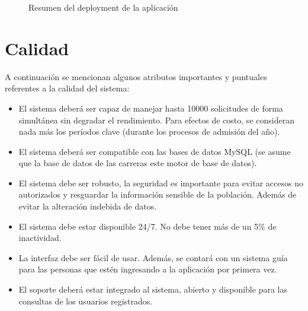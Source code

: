 \documentclass[12pt,a4paper]{article}
\begin{document}
\begin{figure}[H]
  \centering
  \caption{Resumen del deployment de la aplicación}
  \label{fig:deployment}
\end{figure}

\section{Calidad}

A continuación se mencionan algunos atributos importantes y puntuales referentes a la calidad del sistema:

\begin{itemize}
  \item El sistema deberá ser capaz de manejar hasta 10000 solicitudes de forma simultánea sin degradar el rendimiento. Para efectos de costo, se consideran nada más los períodos clave (durante los procesos de admisión del año).
  \item El sistema deberá ser compatible con las bases de datos MySQL (se asume que la base de datos de las carreras este motor de base de datos).
  \item El sistema debe ser robusto, la seguridad es importante para evitar accesos no autorizados y resguardar la información sensible de la población. Además de evitar la alteración indebida de datos.
  \item El sistema debe estar disponible 24/7. No debe tener más de un 5\% de inactividad.
  \item La interfaz debe ser fácil de usar. Además, se contará con un sistema guía para las personas que estén ingresando a la aplicación por primera vez.
  \item El soporte deberá estar integrado al sistema, abierto y disponible para las consultas de los usuarios registrados.
\end{itemize}
\end{document}
